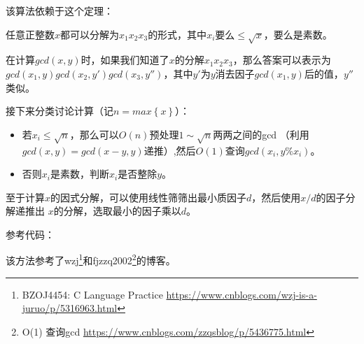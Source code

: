 该算法依赖于这个定理：
\begin{theorem}
	任意正整数$x$都可以分解为$x_1x_2x_3$的形式，其中$x_i$要么$\leq\sqrt{x}$，要么是素数。
\end{theorem}

在计算$gcd(x,y)$时，如果我们知道了$x$的分解$x_1x_2x_3$，那么答案可以表示为
$gcd(x_1,y)gcd(x_2,y')gcd(x_3,y'')$，其中$y'$为$y$消去因子$gcd(x_1,y)$后的值，$y''$类似。

接下来分类讨论计算（记$n=max\left\{x\right\}$）：
\begin{itemize}
	\item 若$x_i\leq \sqrt{n}$，那么可以$O(n)$预处理$1\sim \sqrt{n}$两两之间的gcd
	（利用$gcd(x,y)=gcd(x-y,y)$递推）,然后$O(1)$查询$gcd(x_i,y\%x_i)$。
	\item 否则$x_i$是素数，判断$x_i$是否整除$y$。
\end{itemize}

至于计算$x$的因式分解，可以使用线性筛筛出最小质因子$d$，然后使用$x/d$的因子分解递推出
$x$的分解，选取最小的因子乘以$d$。

参考代码：


该方法参考了wzj\footnote{
	BZOJ4454: C Language Practice
	\url{https://www.cnblogs.com/wzj-is-a-juruo/p/5316963.html}
}和fjzzq2002\footnote{
	O(1) 查询gcd
	\url{https://www.cnblogs.com/zzqsblog/p/5436775.html}
}的博客。
